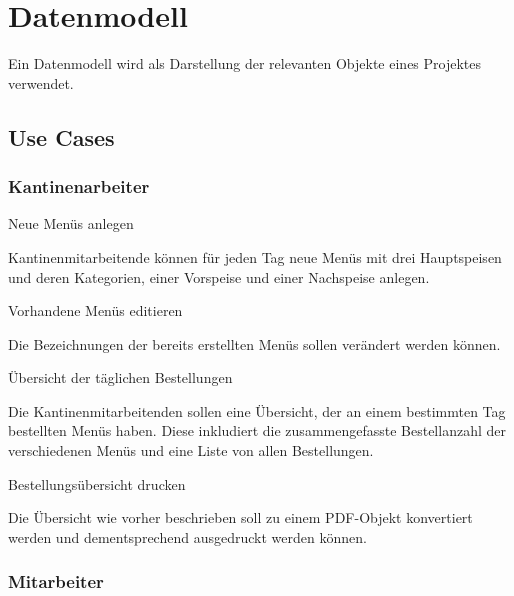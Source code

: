\section{Datenmodell}
\author{David Ignjatovic}

Ein Datenmodell wird als Darstellung der relevanten Objekte eines Projektes verwendet. 

\subsection{Use Cases}

\subsubsection{Kantinenarbeiter}

\begin{compactitem}
    \item Neue Menüs anlegen
    \begin{compactitem}
        \item Kantinenmitarbeitende können für jeden Tag neue Menüs mit drei Hauptspeisen und deren Kategorien, einer Vorspeise und einer Nachspeise anlegen.
    \end{compactitem}
    \item Vorhandene Menüs editieren
    \begin{compactitem}
        \item Die Bezeichnungen der bereits erstellten Menüs sollen verändert werden können.
    \end{compactitem}
    \item Übersicht der täglichen Bestellungen
    \begin{compactitem}
        \item Die Kantinenmitarbeitenden sollen eine Übersicht, der an einem bestimmten Tag bestellten Menüs haben. Diese inkludiert die zusammengefasste Bestellanzahl der verschiedenen Menüs und eine Liste von allen Bestellungen.
    \end{compactitem}
    \item Bestellungsübersicht drucken
    \begin{compactitem}
        \item Die Übersicht wie vorher beschrieben soll zu einem PDF-Objekt konvertiert werden und dementsprechend ausgedruckt werden können.
    \end{compactitem}
\end{compactitem}

\subsubsection{Mitarbeiter}

